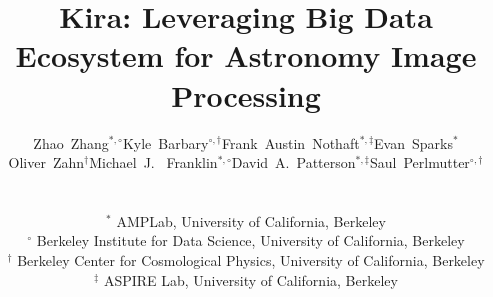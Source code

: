 \documentclass[10pt, conference, compsocconf]{IEEEtran}
\newcommand{\up}{\vspace*{-1em}}
\begin{document}
%

\title{Kira: Leveraging Big Data Ecosystem for  Astronomy Image Processing}

%
%
%
%
%

\author{
\begin{tabular}{cccc}
{Zhao~Zhang$^{*,\circ}$} & {Kyle~Barbary$^{\circ,\dagger}$} & {Frank~Austin~Nothaft$^{*,\ddagger}$} & {Evan~Sparks$^*$} \\
{Oliver~Zahn$^\dagger$} & {Michael~J.~ Franklin$^{*,\circ}$} & {David~A.~Patterson$^{*,\ddagger}$} & {Saul~Perlmutter$^{\circ,\dagger}$}
\end{tabular}
\\%
\begin{tabular}{c}
$^*$ AMPLab, University of California, Berkeley \\
$^\circ$ Berkeley Institute for Data Science, University of California, Berkeley\\
$^\dagger$ Berkeley Center for Cosmological Physics, University of California, Berkeley\\
$^\ddagger$ ASPIRE Lab, University of California, Berkeley \\
\up\up
\end{tabular}
} 
\end{document}
